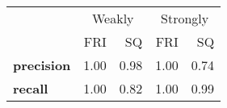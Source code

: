 \begin{tabular}{lrrrr}
\toprule
{} & \multicolumn{2}{c}{Weakly} & \multicolumn{2}{c}{Strongly} \\
{} &    FRI &   SQ &      FRI &   SQ \\
\midrule
\textbf{precision} &   1.00 & 0.98 &     1.00 & 0.74 \\
\textbf{recall   } &   1.00 & 0.82 &     1.00 & 0.99 \\
\bottomrule
\end{tabular}
